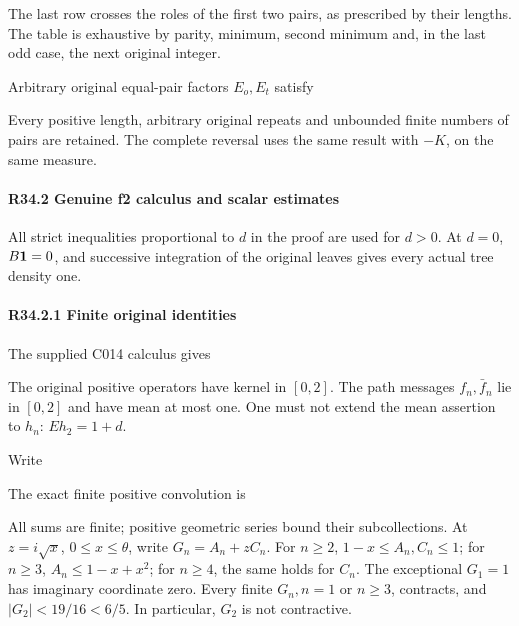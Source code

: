 The last row crosses the roles of the first two pairs, as prescribed by their lengths. The table is exhaustive by parity, minimum,
second minimum and, in the last odd case, the next original integer.

Arbitrary original equal-pair factors \(E_o,\allowbreak  E_t\) satisfy


Every positive length, arbitrary original repeats and unbounded finite
numbers of pairs are retained. The complete reversal uses the same result
with \(-K\), on the same measure.

\paragraph{R34.2 Genuine f2 calculus and scalar estimates}

All strict inequalities proportional to \(d\) in the proof are used for
\(d>0\). At \(d=0\), \(B\mathbf1=0\), and successive integration
of the original leaves gives every actual tree density one.

\paragraph{R34.2.1 Finite original identities}

The supplied C014 calculus gives


The original positive operators have kernel in \([0,\allowbreak  2]\). The path
messages \(f_n,\allowbreak  \bar f_n\) lie in \([0,\allowbreak  2]\) and have mean at most one. One must
not extend the mean assertion to \(h_n\): \(Eh_2=1+d\).

Write


The exact finite positive convolution is


All sums are finite; positive geometric series bound their subcollections.
At \(z=i\sqrt x\), \(0\le x\le\theta\), write \(G_n=A_n+zC_n\).
For \(n\ge2\), \(1-x\le A_n,\allowbreak  C_n\le1\); for \(n\ge3\),
\(A_n\le1-x+x^2\); for \(n\ge4\), the same holds for \(C_n\).
The exceptional \(G_1=1\) has imaginary coordinate zero. Every finite
\(G_n,\allowbreak  n=1\) or \(n\ge3\), contracts, and
\(|G_2|<19/16<6/5\). In particular, \(G_2\) is not contractive.

